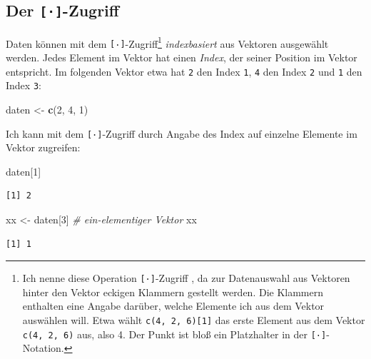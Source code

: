 \documentclass[12pt,]{tufte-book}
\newenvironment{Shaded}{\begin{snugshade}}{\end{snugshade}}
\newcommand{\KeywordTok}[1]{\textcolor[rgb]{0.13,0.29,0.53}{\textbf{#1}}}
\newcommand{\DecValTok}[1]{\textcolor[rgb]{0.00,0.00,0.81}{#1}}
\newcommand{\StringTok}[1]{\textcolor[rgb]{0.31,0.60,0.02}{#1}}
\newcommand{\CommentTok}[1]{\textcolor[rgb]{0.56,0.35,0.01}{\textit{#1}}}
\newcommand{\NormalTok}[1]{#1}
\theoremstyle{definition}
\theoremstyle{definition}
\theoremstyle{definition}
\theoremstyle{remark}
\begin{document}
\subsection{\texorpdfstring{Der
\texttt{{[}·{]}}-Zugriff}{Der {[}·{]}-Zugriff}}\label{veczugriff}

Daten können mit dem \texttt{{[}·{]}}-Zugriff\footnote{Ich nenne diese
  Operation \texttt{{[}·{]}}-Zugriff , da zur Datenauswahl aus Vektoren
  hinter den Vektor eckigen Klammern gestellt werden. Die Klammern
  enthalten eine Angabe darüber, welche Elemente ich aus dem Vektor
  auswählen will. Etwa wählt \texttt{c(4,\ 2,\ 6){[}1{]}} das erste
  Element aus dem Vektor \texttt{c(4,\ 2,\ 6)} aus, also 4. Der Punkt
  ist bloß ein Platzhalter in der \texttt{{[}·{]}}-Notation.}
\emph{indexbasiert} aus Vektoren ausgewählt werden. Jedes Element im
Vektor hat einen \emph{Index}, der seiner Position im Vektor entspricht.
Im folgenden Vektor etwa hat \texttt{2} den Index \texttt{1}, \texttt{4}
den Index \texttt{2} und \texttt{1} den Index \texttt{3}:

\begin{Shaded}
\begin{Highlighting}[]
\NormalTok{daten <-}\StringTok{ }\KeywordTok{c}\NormalTok{(}\DecValTok{2}\NormalTok{, }\DecValTok{4}\NormalTok{, }\DecValTok{1}\NormalTok{)}
\end{Highlighting}
\end{Shaded}

Ich kann mit dem \texttt{{[}·{]}}-Zugriff durch Angabe des Index auf
einzelne Elemente im Vektor zugreifen:

\begin{Shaded}
\begin{Highlighting}[]
\NormalTok{daten[}\DecValTok{1}\NormalTok{]}
\end{Highlighting}
\end{Shaded}

\begin{verbatim}
[1] 2
\end{verbatim}

\begin{Shaded}
\begin{Highlighting}[]
\NormalTok{xx <-}\StringTok{ }\NormalTok{daten[}\DecValTok{3}\NormalTok{]  }\CommentTok{# ein-elementiger Vektor}
\NormalTok{xx}
\end{Highlighting}
\end{Shaded}

\begin{verbatim}
[1] 1
\end{verbatim}
\end{document}
